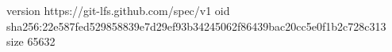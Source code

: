 version https://git-lfs.github.com/spec/v1
oid sha256:22e587fed529858839e7d29ef93b34245062f86439bac20cc5e0f1b2c728c313
size 65632
